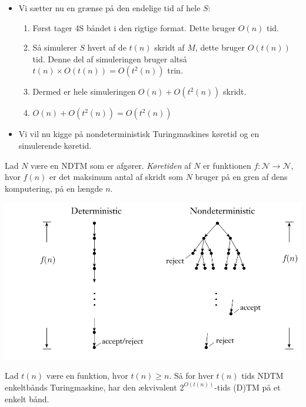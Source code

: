\begin{frame}[allowframebreaks]
\begin{itemize}
		\item Vi sætter nu en grænse på den endelige tid af hele $S$:
		      \begin{enumerate}
			      \item Først tager 4S båndet i den rigtige format. Dette bruger $O(n)$ tid.
			      \item Så simulerer $S$ hvert af de $t(n)$ skridt af $M$, dette bruger $O(t(n))$ tid. Denne del af simuleringen bruger altså $t(n) \times O(t(n)) = O(t^{2}(n))$ trin.
			      \item Dermed er hele simuleringen $O(n) + O(t^{2}(n))$ skridt.
			      \item $O(n) + O(t^{2}(n)) = O(t^{2}(n))$
		      \end{enumerate}

		\item Vi vil nu kigge på nondeterministisk Turingmaskines køretid og en simulerende køretid.
	\end{itemize}
	\begin{definition}
		Lad $N$ være en NDTM som er afgører. \textit{Køretiden} af $N$ er funktionen $f : \mathcal{N} \rightarrow \mathcal{N}$, hvor $f(n)$ er det maksimum antal af skridt som $N$ bruger på en gren af dens komputering, på en længde $n$.
	\end{definition}

	\begin{center}
		\includegraphics[scale=0.3]{figur/figur710.png}
	\end{center}

	\begin{theorem}
		Lad $t(n)$ være en funktion, hvor $t(n) \ge n$. Så for hver $t(n)$ tids NDTM enkeltbånds Turingmaskine, har den ækvivalent $2^{O(t(n))}$-tids (D)TM på et enkelt bånd.
	\end{theorem}


\end{frame}

